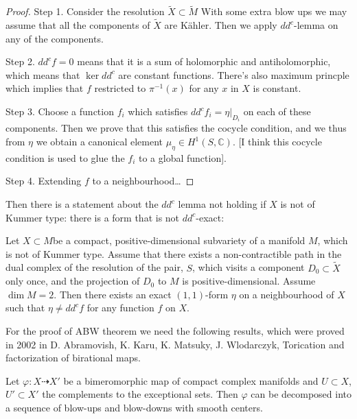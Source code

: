 \begin{proof}
\noindent
Step 1. Consider the resolution $\tilde{X} \subset \tilde{M}$
With some extra blow ups we may assume that all the 
components of $\tilde{X}$ are Kähler.
Then we apply $dd^c$-lemma on any of the components.

\medskip\noindent
Step 2. $dd^cf=0$ means that it is a sum of holomorphic
and antiholomorphic,
which means that $\ker dd^c$ are
constant functions. There's also maximum princple
which implies that $f$ restricted to $\pi^{-1}(x)$ for any
$x$ in $X$ is constant.

\medskip\noindent
Step 3. Choose a function $f_i$ which satisfies
$dd^c f_i=\eta|_{D_i}$ on each of these components.
Then we prove that this satisfies the cocycle condition,
and we thus from $\eta$ we obtain a canonical element 
$\mu_\eta \in H^1(S,\mathbb{C})$.
[I think this cocycle condition is used
to glue the $f_i$ to a global function].

\medskip\noindent
Step 4. Extending $f$ to a neighbourhood…
\end{proof}

\noindent
Then there is a statement about the $dd^c$ lemma not
holding if $X$ is not of Kummer type: there is a form
that is not $dd^c$-exact:

\begin{theorem}
\label{theorem-ddc-counterexample}
Let $X \subset M$be a compact, positive-dimensional
subvariety of a manifold $M$, which is not of Kummer type.
Assume that there exists a non-contractible path in the
dual complex of the resolution of the pair, $S$,
which visits a component $D_0 \subset \tilde{X}$
only once, and the projection of $D_0$ to $M$
is positive-dimensional.
Assume $\dim M=2$.
Then there exists an exact $(1,1)$-form $\eta$
on a neighbourhood of $X$ such that $\eta \neq  dd^cf$ for any 
function $f$ on $X$.
\end{theorem}

\medskip\noindent
For the proof of ABW theorem we need the following results,
which were proved in 2002 in D. Abramovish, K. Karu, K. Matsuky,
J. Wlodarczyk, Torication and factorization of birational maps.

\begin{theorem}
\label{theorem-weak-factorization-theorem}
Let $\varphi: X \dashrightarrow X'$ be a bimeromorphic map
of compact complex manifolds and $U \subset X$, $U' \subset X'$
the complements to the exceptional sets.
Then $\varphi$ can be decomposed 
into a sequence of blow-ups and blow-downs with
smooth centers.
\end{theorem}

